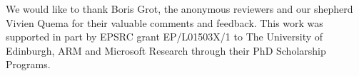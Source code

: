 \begin{acks}
 We would like to thank Boris Grot, the anonymous reviewers and our shepherd Vivien Quema for their valuable comments and feedback. 
 This work was supported in part by EPSRC grant EP/L01503X/1 to The University of Edinburgh, ARM and Microsoft Research through their PhD Scholarship Programs.
\end{acks}